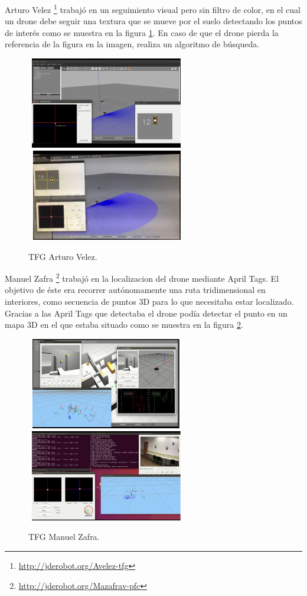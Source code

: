 \hspace{1 cm} Arturo Velez \footnote{\url{http://jderobot.org/Avelez-tfg}} \cite{MediaWikiArturoVelezDuque} trabaj\'o en un seguimiento visual pero sin filtro de color, en el cual un drone debe seguir una textura que se mueve por el suelo detectando los puntos de inter\'es como se muestra en la figura \ref{f:ArturoVelez}. En caso de que el drone pierda la referencia de la figura en la imagen, realiza un algoritmo de b\'usqueda.
\begin{figure}[H]
 \centering
    \includegraphics[width=7cm,height=4cm]{imgs/ArturoVelez1_1.png}
    \includegraphics[width=7cm,height=4cm]{imgs/ArturoVelez2_1.png}
 \caption{TFG Arturo Velez.}
 \label{f:ArturoVelez}
\end{figure} 


\hspace{1 cm} Manuel Zafra \footnote{\url{http://jderobot.org/Mazafrav-pfc}} \cite{MediaWikiManuelZafraVillar} trabaj\'o en la localizacion del drone mediante April Tags. El objetivo de \'este era recorrer aut\'onomamente una ruta tridimensional en interiores, como secuencia de puntos 3D para lo que necesitaba estar localizado. Gracias a las April Tags que detectaba el drone pod\'ia detectar el punto en un mapa 3D en el que estaba situado como se muestra en la figura \ref{f:ManuelZafra}.
\begin{figure}[H]
 \centering
    \includegraphics[width=7cm,height=4cm]{imgs/ManuelZafra1_1.png}
    \includegraphics[width=7cm,height=4cm]{imgs/ManuelZafra2_1.png}
 \caption{TFG Manuel Zafra.}
 \label{f:ManuelZafra}
\end{figure} 

